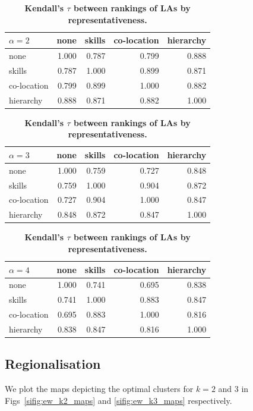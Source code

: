 \documentclass[aps,pre,floats,floatfix,superscriptaddress,twocolumn,final,10pt]{revtex4-2}
\theoremstyle{definition}
\begin{document}
\begin{table}[]
    \centering
    \begin{tabular}{lrrrr}
    \toprule
     $\alpha=2$ & none & skills & co-location & hierarchy \\
    \midrule
    none & 1.000 & 0.787 & 0.799 & 0.888 \\
    skills & 0.787 & 1.000 & 0.899 & 0.871 \\
    co-location & 0.799 & 0.899 & 1.000 & 0.882 \\
    hierarchy & 0.888 & 0.871 & 0.882 & 1.000 \\
    \bottomrule
    \end{tabular}
    
    \begin{tabular}{lrrrr}
    \toprule
     $\alpha=3$ & none & skills & co-location & hierarchy \\
    \midrule
    none & 1.000 & 0.759 & 0.727 & 0.848 \\
    skills & 0.759 & 1.000 & 0.904 & 0.872 \\
    co-location & 0.727 & 0.904 & 1.000 & 0.847 \\
    hierarchy & 0.848 & 0.872 & 0.847 & 1.000 \\
    \bottomrule
    \end{tabular}
    
    \begin{tabular}{lrrrr}
    \toprule
     $\alpha=4$ & none & skills & co-location & hierarchy \\
    \midrule
    none & 1.000 & 0.741 & 0.695 & 0.838 \\
    skills & 0.741 & 1.000 & 0.883 & 0.847 \\
    co-location & 0.695 & 0.883 & 1.000 & 0.816 \\
    hierarchy & 0.838 & 0.847 & 0.816 & 1.000 \\
    \bottomrule
    \end{tabular}
    \caption{\textbf{Kendall's $\tau$ between rankings of LAs by representativeness.}}
    \label{sitab:kendall_LAs_representativeness}
\end{table}

\subsection{Regionalisation}

We plot the maps depicting the optimal clusters for $k=2$ and $3$ in Figs~\ref{sifig:ew_k2_maps} and \ref{sifig:ew_k3_maps} respectively.
\end{document}
